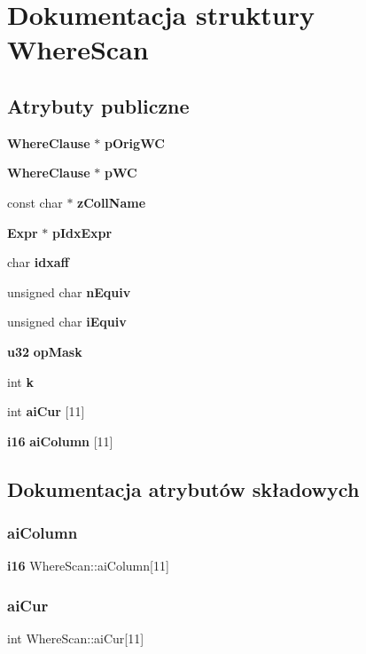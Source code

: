\section{Dokumentacja struktury Where\+Scan}
\label{struct_where_scan}
\subsection*{Atrybuty publiczne}
\begin{DoxyCompactItemize}
\item 
\textbf{ Where\+Clause} $\ast$ \textbf{ p\+Orig\+WC}
\item 
\textbf{ Where\+Clause} $\ast$ \textbf{ p\+WC}
\item 
const char $\ast$ \textbf{ z\+Coll\+Name}
\item 
\textbf{ Expr} $\ast$ \textbf{ p\+Idx\+Expr}
\item 
char \textbf{ idxaff}
\item 
unsigned char \textbf{ n\+Equiv}
\item 
unsigned char \textbf{ i\+Equiv}
\item 
\textbf{ u32} \textbf{ op\+Mask}
\item 
int \textbf{ k}
\item 
int \textbf{ ai\+Cur} [11]
\item 
\textbf{ i16} \textbf{ ai\+Column} [11]
\end{DoxyCompactItemize}


\subsection{Dokumentacja atrybutów składowych}
\mbox{\label{struct_where_scan_a5a55fc1ad5f48ef922ea89c9603f8f38}} 
\subsubsection{aiColumn}
{\footnotesize\ttfamily \textbf{ i16} Where\+Scan\+::ai\+Column[11]}

\mbox{\label{struct_where_scan_a0795799165cb58df1402063f03daf1a6}} 
\subsubsection{aiCur}
{\footnotesize\ttfamily int Where\+Scan\+::ai\+Cur[11]}

